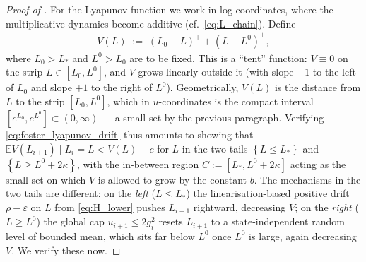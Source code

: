 \documentclass[10pt,a4paper]{amsart}
\newcommand{\Exp}[1]{\mathbb{E} #1}
\newcommand{\Set}[1]{\left\{ #1 \right\}}
\newcommand{\cond}{\mid}
\newcommand{\eps}{\varepsilon}
\begin{document}
\begin{proof}[Proof of ]
  For the Lyapunov function we work in log-coordinates, where the multiplicative dynamics become additive (cf.\ \eqref{eq:L_chain}). Define
  \begin{eqnarray*}
    V(L) \;:=\; (L_0 - L)^+ + (L - L^0)^+,
  \end{eqnarray*}
  where $L_0 > L_*$ and $L^0 > L_0$ are to be fixed. This is a ``tent'' function: $V \equiv 0$ on the strip $L \in [L_0, L^0]$, and $V$ grows linearly outside it (with slope $-1$ to the left of $L_0$ and slope $+1$ to the right of $L^0$). Geometrically, $V(L)$ is the distance from $L$ to the strip $[L_0, L^0]$, which in $u$-coordinates is the compact interval $[e^{L_0}, e^{L^0}] \subset (0,\infty)$ --- a small set by the previous paragraph. Verifying \eqref{eq:foster_lyapunov_drift} thus amounts to showing that $\Exp{V(L_{i+1}) \cond L_i = L} < V(L) - c$ for $L$ in the two tails $\Set{L \le L_*}$ and $\Set{L \ge L^0 + 2\kappa}$, with the in-between region $C := [L_*, L^0 + 2\kappa]$ acting as the small set on which $V$ is allowed to grow by the constant $b$. The mechanisms in the two tails are different: on the \emph{left} ($L \le L_*$) the linearisation-based positive drift $\rho - \eps$ on $L$ from \eqref{eq:H_lower} pushes $L_{i+1}$ rightward, decreasing $V$; on the \emph{right} ($L \ge L^0$) the global cap $u_{i+1} \le 2 g_i^2$ resets $L_{i+1}$ to a state-independent random level of bounded mean, which sits far below $L^0$ once $L^0$ is large, again decreasing $V$. We verify these now.


\end{proof}
\end{document}
